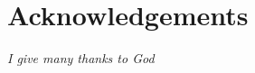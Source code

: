 \cleardoublepage
\thispagestyle{empty}


\chapter*{Acknowledgements}

\vfill


{\normalsize \it \hfill I give many thanks to God \vspace*{4pt}}

